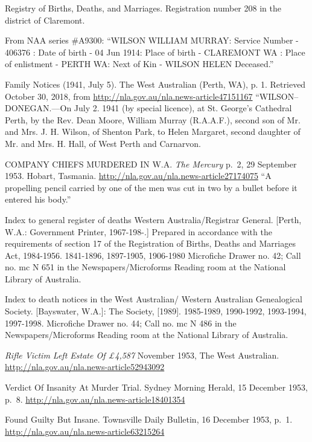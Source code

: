 \begin{thebibliography}{999}
	Registry of Births, Deaths, and Marriages. Registration number 208 in the district of Claremont.

	From NAA series \#A9300: ``WILSON WILLIAM MURRAY: Service Number - 406376
	: Date of birth - 04 Jun 1914: Place of birth - CLAREMONT WA
	: Place of enlistment - PERTH WA: Next of Kin - WILSON HELEN Deceased.''

    Family Notices (1941, July 5). The West Australian (Perth, WA), p. 1.
    Retrieved October 30, 2018, from \url{http://nla.gov.au/nla.news-article47151167}
    ``WILSON--DONEGAN.---On July 2. 1941 (by special licence), at St. George's Cathedral Perth, by the Rev. Dean Moore,
    William Murray (R.A.A.F.), second son of Mr. and Mrs. J. H. Wilson, of Shenton Park,
    to Helen Margaret, second daughter of Mr. and Mrs. H. Hall, of West Perth and Carnarvon.

	 COMPANY CHIEFS MURDERED IN W.A. \emph{The Mercury} p.\ 2, 29 September 1953. Hobart, Tasmania.
	 \url{http://nla.gov.au/nla.news-article27174075}
	 ``A propelling pencil carried by one of the men was cut in two by a bullet before it entered his body.''

	Index to general register of deaths Western Australia/Registrar General. [Perth, W.A.: Government Printer, 1967-198-.] Prepared in accordance with the requirements of section 17 of the Registration of Births, Deaths and Marriages Act, 1984-1956. 1841-1896, 1897-1905, 1906-1980 Microfiche Drawer no. 42; Call no. mc N 651 in the Newspapers/Microforms Reading room at the National Library of Australia.

	Index to death notices in the West Australian/ Western Australian Genealogical Society. [Bayswater, W.A.]: The Society, [1989]. 1985-1989, 1990-1992, 1993-1994, 1997-1998. Microfiche Drawer no. 44; Call no. mc N 486 in the Newspapers/Microforms Reading room at the National Library of Australia.

	\emph{Rifle Victim Left Estate Of \pounds 4,587} November 1953, The West Australian.
	\url{http://nla.gov.au/nla.news-article52943092}

	Verdict Of Insanity At Murder Trial. Sydney Morning Herald, 15 December 1953, p.\ 8.
	\url{http://nla.gov.au/nla.news-article18401354}

	Found Guilty But Insane. Townsville Daily Bulletin, 16 December 1953, p.\ 1.
	\url{http://nla.gov.au/nla.news-article63215264}


\end{thebibliography}
